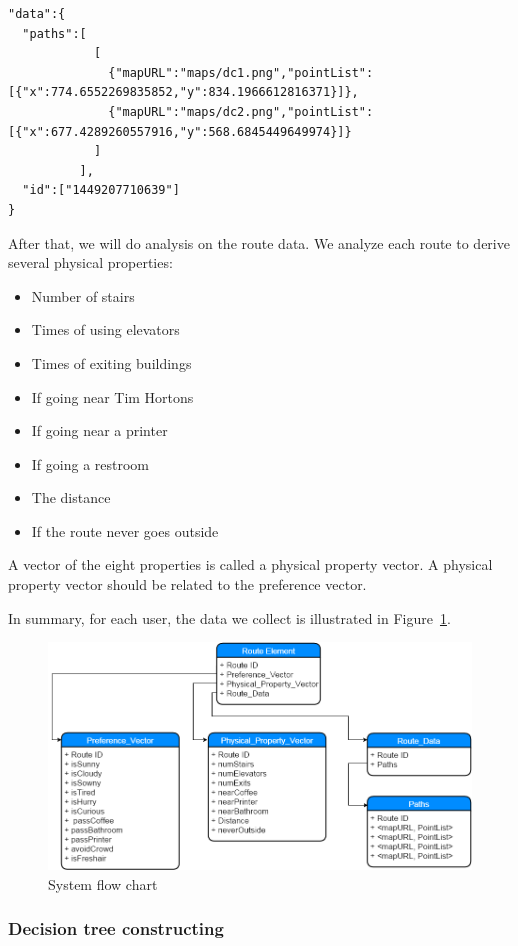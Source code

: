 \documentclass{sigchi}
\begin{document}
\begin{lstlisting}
"data":{
  "paths":[
            [
              {"mapURL":"maps/dc1.png","pointList":[{"x":774.6552269835852,"y":834.1966612816371}]},
              {"mapURL":"maps/dc2.png","pointList":[{"x":677.4289260557916,"y":568.6845449649974}]}
            ]
          ],
  "id":["1449207710639"]
}
\end{lstlisting}

After that, we will do analysis on the route data. We analyze each route to derive several physical properties:
\begin{itemize}
\item Number of stairs
\item Times of using elevators
\item Times of exiting buildings
\item If going near Tim Hortons
\item If going near a printer
\item If going a restroom
\item The distance
\item If the route never goes outside
\end{itemize}

A vector of the eight properties is called a physical property vector. A physical property vector should be related to the preference vector.


In summary, for each user, the data we collect is illustrated in Figure~\ref{fig:element-detail}.

\begin{figure}[!h]
\centering
\includegraphics[width=1.0\columnwidth]{pics/element-detail.png}
\caption{System flow chart}
\label{fig:element-detail}
\end{figure}

\subsubsection{Decision tree constructing}
\end{document}
